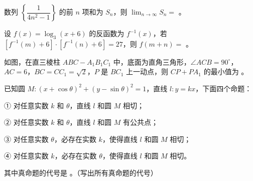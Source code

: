 \begin{question}
数列 $\left\{\dfrac1{4n^2-1}\right\}$ 的前 $n$ 项和为 $S_n$，则 $\lim_{n\to\infty}S_n=$ \gkblank{}。

\end{question}
\begin{question}
设 $f(x)=\log_3(x+6)$ 的反函数为 $f^{-1}(x)$，若 $[f^{-1}(m)+6]\cdot[f^{-1}(n)+6]=27$，则 $f(m+n)=$ \gkblank{}。

\Needspace{0.4\textheight}
\end{question}
\begin{question}
如图，在直三棱柱 $ABC-A_1B_1C_1$ 中，底面为直角三角形，$\angle ACB=90^\circ$，$AC=6\text{，}BC=CC_1=\sqrt2$，$P$ 是 $BC_1$ 上一动点，则 $CP+PA_1$ 的最小值为 \gkblank{}。
\nopagebreak[4]
\begin{center}\end{center}
\nopagebreak[4]
\end{question}
\begin{question}
已知圆 $M:(x+\cos\theta)^2+(y-\sin\theta)^2=1$，直线 $l:y=kx$，下面四个命题：

① 对任意实数 $k$ 和 $\theta$，直线 $l$ 和圆 $M$ 相切；

② 对任意实数 $k$ 和 $\theta$，直线 $l$ 和圆 $M$ 有公共点；

③ 对任意实数 $\theta$，必存在实数 $k$，使得直线 $l$ 和圆 $M$ 相切；

④ 对任意实数 $k$，必存在实数 $\theta$，使得直线 $l$ 和圆 $M$ 相切。

其中真命题的代号是 \gkblank{}。（写出所有真命题的代号）

\end{question}

